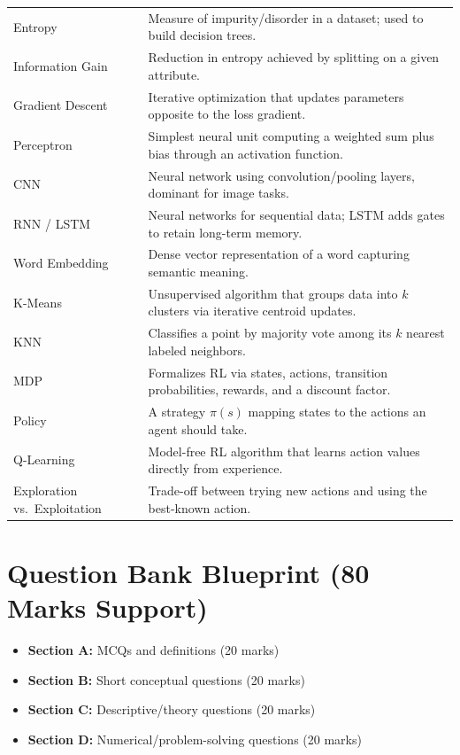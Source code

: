 \documentclass[11pt,a4paper]{article}
\begin{document}
\begin{longtable}{@{}p{3.3cm}p{10.2cm}@{}}
\addlinespace
Entropy & Measure of impurity/disorder in a dataset; used to build decision trees. \\
\addlinespace
Information Gain & Reduction in entropy achieved by splitting on a given attribute. \\
\addlinespace
Gradient Descent & Iterative optimization that updates parameters opposite to the loss gradient. \\
\addlinespace
Perceptron & Simplest neural unit computing a weighted sum plus bias through an activation function. \\
\addlinespace
CNN & Neural network using convolution/pooling layers, dominant for image tasks. \\
\addlinespace
RNN / LSTM & Neural networks for sequential data; LSTM adds gates to retain long-term memory. \\
\addlinespace
Word Embedding & Dense vector representation of a word capturing semantic meaning. \\
\addlinespace
K-Means & Unsupervised algorithm that groups data into $k$ clusters via iterative centroid updates. \\
\addlinespace
KNN & Classifies a point by majority vote among its $k$ nearest labeled neighbors. \\
\addlinespace
MDP & Formalizes RL via states, actions, transition probabilities, rewards, and a discount factor. \\
\addlinespace
Policy & A strategy $\pi(s)$ mapping states to the actions an agent should take. \\
\addlinespace
Q-Learning & Model-free RL algorithm that learns action values directly from experience. \\
\addlinespace
Exploration vs.\ Exploitation & Trade-off between trying new actions and using the best-known action. \\
\bottomrule
\end{longtable}

\section{Question Bank Blueprint (80 Marks Support)}

\begin{conceptbox}
\begin{itemize}[leftmargin=*]
  \item \textbf{Section A:} MCQs and definitions (20 marks)
  \item \textbf{Section B:} Short conceptual questions (20 marks)
  \item \textbf{Section C:} Descriptive/theory questions (20 marks)
  \item \textbf{Section D:} Numerical/problem-solving questions (20 marks)
\end{itemize}
\end{conceptbox}
\end{document}
